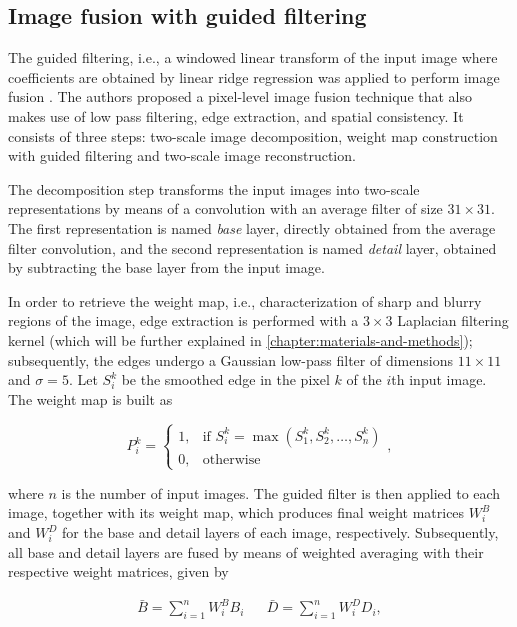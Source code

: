 \subsection{Image fusion with guided filtering}

The guided filtering, i.e., a windowed linear transform of the input image where coefficients are obtained by linear ridge regression was applied to perform image fusion \cite{li2013image}. The authors proposed a pixel-level image fusion technique that also makes use of low pass filtering, edge extraction, and spatial consistency. It consists of three steps: two-scale image decomposition, weight map construction with guided filtering and two-scale image reconstruction.

The decomposition step transforms the input images into two-scale representations by means of a convolution with an average filter of size $31 \times 31$. The first representation is named \emph{base} layer, directly obtained from the average filter convolution, and the second representation is named \emph{detail} layer, obtained by subtracting the base layer from the input image.

In order to retrieve the weight map, i.e., characterization of sharp and blurry regions of the image, edge extraction is performed with a $3 \times 3$ Laplacian filtering kernel (which will be further explained in \autoref{chapter:materials-and-methods}); subsequently, the edges undergo a Gaussian low-pass filter of dimensions $11 \times 11$ and $\sigma = 5$. Let $S_{i}^{k}$ be the smoothed edge in the pixel $k$ of the $i$th input image. The weight map is built as

\begin{equation}
\label{eqn:weight_map}
P_{i}^{k} = 
    \begin{cases}
        1, & \text{if } S_{i}^{k} = \max{(S_{1}^{k},S_{2}^{k},\dots,S_{n}^{k})}\\
        0, & \text{otherwise}
    \end{cases},
\end{equation}

\noindent where $n$ is the number of input images. The guided filter is then applied to each image, together with its weight map, which produces final weight matrices $W_{i}^{B}$ and $W_{i}^{D}$ for the base and detail layers of each image, respectively. Subsequently, all base and detail layers are fused by means of weighted averaging with their respective weight matrices, given by

\begin{align}
\bar{B} = \sum_{i=1}^{n}W_{i}^{B}B_{i}
&&
\bar{D} = \sum_{i=1}^{n}W_{i}^{D}D_{i},
\end{align}

